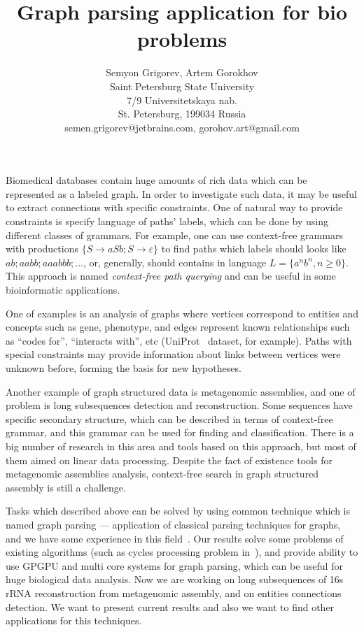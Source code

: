 \documentclass[12pt]{article}  %
\title{Graph parsing application for bio problems}
\author{Semyon Grigorev, Artem Gorokhov
\\
       {Saint Petersburg State University}\\
       {7/9 Universitetskaya nab.}\\
       {St. Petersburg, 199034 Russia}\\
       semen.grigorev@jetbrains.com, gorohov.art@gmail.com
       }
\date{}
\theoremstyle{definition}
\theoremstyle{remark}
\begin{document}
\maketitle

Biomedical databases contain huge amounts of rich data which can be represented as a labeled graph.
In order to investigate such data, it may be useful to extract connections with specific constraints.
One of natural way to provide constraints is specify language of paths' labels, which can be done by using different classes of grammars.
For example, one can use context-free grammars with productions $\{S \rightarrow a S b; S \rightarrow \varepsilon \}$ to find paths which labels should looks like $ab; aabb; aaabbb; ...$, or, generally, should contains in language $L = \{a^n b^n, n \geq 0\}$.
This approach is named \emph{context-free path querying} and can be useful in some bioinformatic applications.

One of examples is an analysis of graphs where vertices correspond to entities and concepts such as gene, phenotype, and edges represent known relationships such as ``codes for'', ``interacts with'', etc (UniProt~\cite{UniProt} dataset, for example).
Paths with special constraints may provide information about links between vertices were unknown before, forming the basis for new hypotheses.

Another example of graph structured data is metagenomic assemblies, and one of problem is long subsequences detection and reconstruction.
Some sequences have specific secondary structure, which can be described in terms of context-free grammar, and this grammar can be used for finding and classification.
There is a big number of research in this area and tools based on this approach, but most of them aimed on linear data processing. 
Despite the fact of existence tools for metagenomic assemblies analysis, context-free search in graph structured assembly is still a challenge.


Tasks which described above can be solved by using common technique which is named graph parsing --- application of classical parsing techniques for graphs, and we have some experience in this field~\cite{GraphGLL, RelaxedRNGLR}.
Our results solve some problems of existing algorithms (such as cycles processing problem in~\cite{Earley}), and provide ability to use GPGPU and multi core systems for graph parsing, which can be useful for huge biological data analysis.
Now we are working on long subsequences of 16s rRNA reconstruction from metagenomic assembly, and on entities connections detection.
We want to present current results and also we want to find other applications for this techniques.
\end{document}
